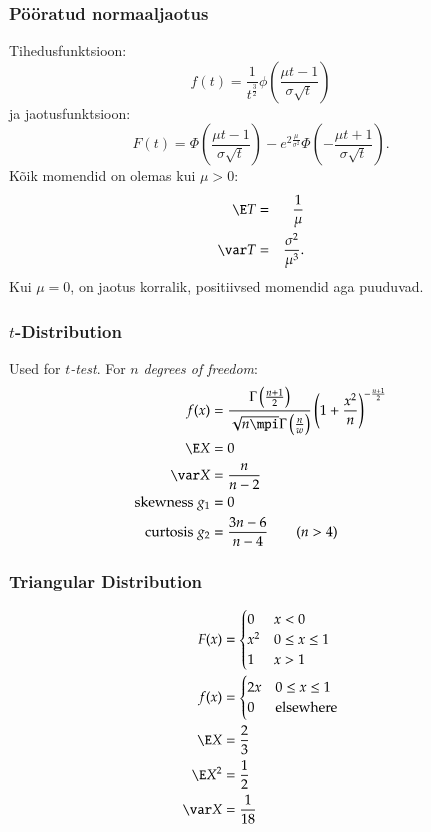 \documentclass[a4paper]{article}
\numberwithin{equation}{subsection}
\begin{document}
\subsubsection{Pööratud normaaljaotus}
Tihedusfunktsioon:
\begin{equation}
f(t) = \frac{1}{t^\frac{3}{2}}
  \phi \left( \frac{ \mu t - 1}{\sigma\sqrt{t}} \right)
\end{equation}
ja jaotusfunktsioon:
\begin{equation}
F(t) = 
  \Phi \left( \frac{\mu t -1}{\sigma\sqrt{t}} \right) -
  e^{2\frac{\mu}{\sigma^2}}
    \Phi \left( - \frac{\mu t+1}{\sigma \sqrt{t}} \right).
\end{equation}
Kõik momendid on olemas kui $\mu>0$:
\begin{eqnarray}
\E T &=& \frac{1}{\mu} \\
\var T &=& \frac{\sigma^2}{\mu^3}.
\end{eqnarray}
Kui $\mu=0$, on jaotus korralik, positiivsed momendid aga puuduvad.  


\subsubsection{$t$-Distribution}
\label{sec:t-distribution}

Used for \emph{$t$-test}.  For $n$ \emph{degrees of freedom}:
\begin{align}
  f(x)
  &=
  \frac{\Gamma \left( \frac{n + 1}{2} \right)}
  {\sqrt{n \mpi} \Gamma \left( \frac{n}{w} \right)}
  \left(
    1 + \frac{x^{2}}{n}
  \right)^{-\frac{n + 1}{2}}
  \\
  \E X &= 0
  \\
  \var X &= \frac{n}{n - 2}
  \\
  \text{skewness } g_{1} &= 0
  \\
  \text{curtosis } g_{2} &= \frac{3n - 6}{n - 4} \qquad (n > 4)
\end{align}

\subsubsection{Triangular Distribution}

\begin{align}
  F(x) &= 
         \begin{cases}
           0 & x < 0\\
           x^{2} & 0 \le x \le 1\\
           1 & x > 1
         \end{cases}
  \\               
  f(x) &= 
         \begin{cases}
           2x & 0 \le x \le 1\\
           0 & \text{elsewhere}
         \end{cases}
  \\
  \E X &= \frac{2}{3}
  \\
  \E X^{2} &= \frac{1}{2}
  \\
  \var X &= \frac{1}{18}
\end{align}
\end{document}
